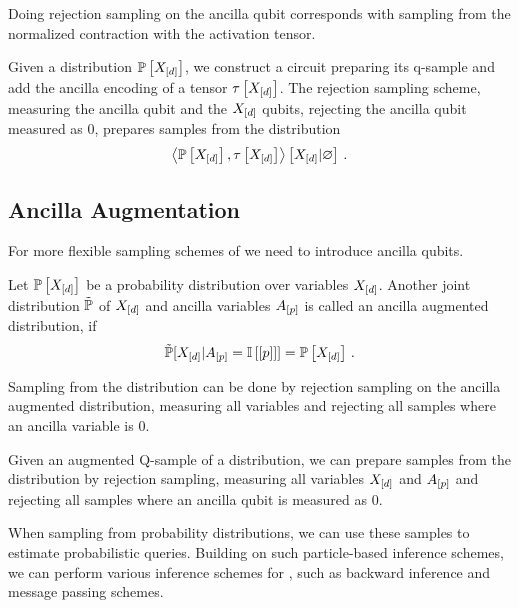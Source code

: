 Doing rejection sampling on the ancilla qubit corresponds with sampling from the normalized contraction with the activation tensor.

\begin{lemma}
    Given a distribution $\mathbb{P}\left[X_{[d]}\right]$, we construct a circuit preparing its q-sample and add the ancilla encoding of a tensor $\tau\left[X_{[d]}\right]$.
    The rejection sampling scheme, measuring the ancilla qubit and the $X_{[d]}$ qubits, rejecting the ancilla qubit measured as $0$, prepares samples from the distribution
    \begin{align*}
        \left\langle \mathbb{P}\left[X_{[d]}\right],\tau\left[X_{[d]}\right]\right\rangle \left[ X_{[d]} | \varnothing \right] \, .
    \end{align*}
\end{lemma}

\subsection{Ancilla Augmentation}

For more flexible sampling schemes of \ComputationActivationNetworks{} we need to introduce ancilla qubits.

\begin{definition}
    Let $\mathbb{P}\left[X_{[d]}\right]$ be a probability distribution over variables $X_{[d]}$.
    Another joint distribution $\tilde{\mathbb{P}}$ of $X_{[d]}$ and ancilla variables $A_{[p]}$ is called an ancilla augmented distribution, if
    \begin{align*}
        \tilde{\mathbb{P}}[X_{[d]}|A_{[p]}=\mathbb{I}\left[[p]\right]] = \mathbb{P}\left[X_{[d]}\right] \, .
    \end{align*}
\end{definition}

Sampling from the distribution can be done by rejection sampling on the ancilla augmented distribution, measuring all variables and rejecting all samples where an ancilla variable is $0$.

Given an augmented Q-sample of a distribution, we can prepare samples from the distribution by rejection sampling, measuring all variables $X_{[d]}$ and $A_{[p]}$ and rejecting all samples where an ancilla qubit is measured as $0$.

When sampling from probability distributions, we can use these samples to estimate probabilistic queries.
Building on such particle-based inference schemes, we can perform various inference schemes for \ComputationActivationNetworks{}, such as backward inference and message passing schemes.

